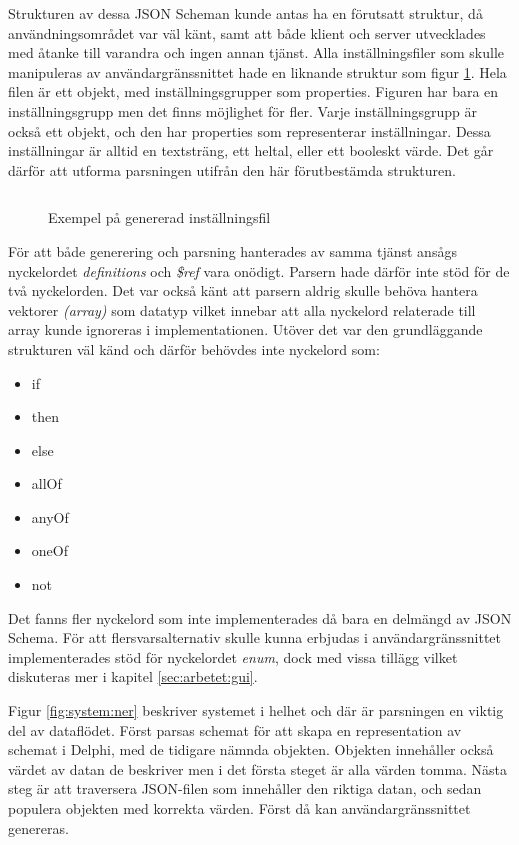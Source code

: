 Strukturen av dessa JSON Scheman kunde antas ha en förutsatt struktur, då användningsområdet var väl känt, samt att både klient och server utvecklades med åtanke till varandra och ingen annan tjänst. Alla inställningsfiler som skulle manipuleras av användargränssnittet hade en liknande struktur som figur \ref{fig:profile-file}. Hela filen är ett objekt, med inställningsgrupper som properties. Figuren har bara en inställningsgrupp men det finns möjlighet för fler. Varje inställningsgrupp är också ett objekt, och den har properties som representerar inställningar. Dessa inställningar är alltid en textsträng, ett heltal, eller ett booleskt värde. Det går därför att utforma parsningen utifrån den här förutbestämda strukturen.

\begin{figure}
	\inputminted[tabsize=2, frame=single, fontsize=\small, framesep=2mm, breaklines]{json}{code/0.json}
	\vspace{-1.7em}
	\caption{Exempel på genererad inställningsfil}
	\label{fig:profile-file}
\end{figure}
\FloatBarrier

\noindent
För att både generering och parsning hanterades av samma tjänst ansågs nyckelordet \textit{definitions} och \textit{\$ref} vara onödigt. Parsern hade därför inte stöd för de två nyckelorden. Det var också känt att parsern aldrig skulle behöva hantera vektorer \textit{(array)} som datatyp vilket innebar att alla nyckelord relaterade till array kunde ignoreras i implementationen. Utöver det var den grundläggande strukturen väl känd och därför behövdes inte nyckelord som:

\begin{itemize}
	\item if
	\item then
	\item else
	\item allOf
	\item anyOf
	\item oneOf
	\item not
\end{itemize}

\noindent
Det fanns fler nyckelord som inte implementerades då bara en delmängd av JSON Schema. För att flersvarsalternativ skulle kunna erbjudas i användargränssnittet implementerades stöd för nyckelordet \textit{enum}, dock med vissa tillägg vilket diskuteras mer i kapitel \ref{sec:arbetet:gui}.

Figur \ref{fig:system:ner} beskriver systemet i helhet och där är parsningen en viktig del av dataflödet. Först parsas schemat för att skapa en representation av schemat i Delphi, med de tidigare nämnda objekten. Objekten innehåller också värdet av datan de beskriver men i det första steget är alla värden tomma. Nästa steg är att traversera JSON-filen som innehåller den riktiga datan, och sedan populera objekten med korrekta värden. Först då kan användargränssnittet genereras.

